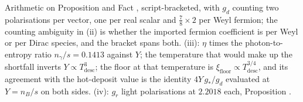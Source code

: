 Arithmetic on Proposition  and Fact , script-bracketed, with $g_{d}$ counting two polarisations per vector, one per real scalar and $\tfrac{7}{8} \times 2$ per Weyl fermion; the counting ambiguity in (ii) is whether the imported fermion coefficient is per Weyl or per Dirac species, and the bracket spans both. (iii): $\eta$ times the photon-to-entropy ratio $n_{\gamma}/s = 0.1413$ against $Y$; the temperature that would make up the shortfall inverts $Y \propto T_{\mathrm{desc}}^{3}$; the floor at that temperature is $\xi_{\mathrm{floor}} \propto T_{\mathrm{desc}}^{3/4}$, and its agreement with the hot-deposit value is the identity $4Y\,g_{*}/g_{d}$ evaluated at $Y = n_{B}/s$ on both sides. (iv): $g_{r}$ light polarisations at $2.2018$ each, Proposition .
